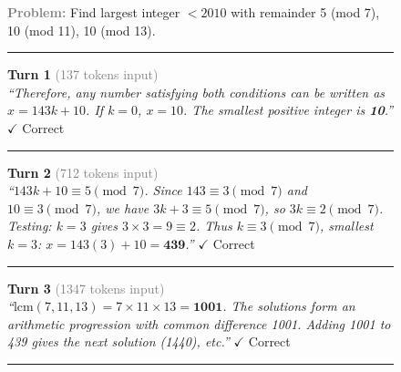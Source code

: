 \begin{figure}[!t]
  \centering
  \scriptsize

  \begin{minipage}[t]{0.48\textwidth}
    \begin{mdframed}[
      frametitle={\textbf{Full History (Qwen3.5-4B) -- Failure}},
      frametitlerule=true,
      frametitlebackgroundcolor=red!15,
      backgroundcolor=red!3,
      linecolor=red!60,
      linewidth=1pt,
      innertopmargin=6pt,
      innerbottommargin=6pt
    ]
    \textcolor{gray}{\textbf{Problem:}} Find largest integer $<2010$ with remainder 5 (mod 7), 10 (mod 11), 10 (mod 13).

    \vspace{2pt}\hrule\vspace{2pt}

    \textcolor{blue!70}{\textbf{Turn 1}} \textcolor{gray}{(137 tokens input)}\\
    \textit{``Therefore, any number satisfying both conditions can be written as $x = 143k + 10$. If $k=0$, $x=10$. The smallest positive integer is \textbf{10}.''}
    \hfill{\scriptsize\textcolor{green!60!black}{$\checkmark$ Correct}}

    \vspace{2pt}\hrule\vspace{2pt}

    \textcolor{blue!70}{\textbf{Turn 2}} \textcolor{gray}{(712 tokens input)}\\
    \textit{``$143k + 10 \equiv 5 \pmod{7}$. Since $143 \equiv 3 \pmod{7}$ and $10 \equiv 3 \pmod{7}$, we have $3k + 3 \equiv 5 \pmod{7}$, so $3k \equiv 2 \pmod{7}$. Testing: $k=3$ gives $3 \times 3 = 9 \equiv 2$. Thus $k \equiv 3 \pmod{7}$, smallest $k=3$: $x = 143(3) + 10 = \textbf{439}$.''}
    \hfill{\scriptsize\textcolor{green!60!black}{$\checkmark$ Correct}}

    \vspace{2pt}\hrule\vspace{2pt}

    \textcolor{blue!70}{\textbf{Turn 3}} \textcolor{gray}{(1347 tokens input)}\\
    \textit{``$\text{lcm}(7, 11, 13) = 7 \times 11 \times 13 = \textbf{1001}$. The solutions form an arithmetic progression with common difference 1001. Adding 1001 to 439 gives the next solution (1440), etc.''}
    \hfill{\scriptsize\textcolor{green!60!black}{$\checkmark$ Correct}}

    \vspace{2pt}\hrule\vspace{2pt}


\end{mdframed}
\end{minipage}
\end{figure}
